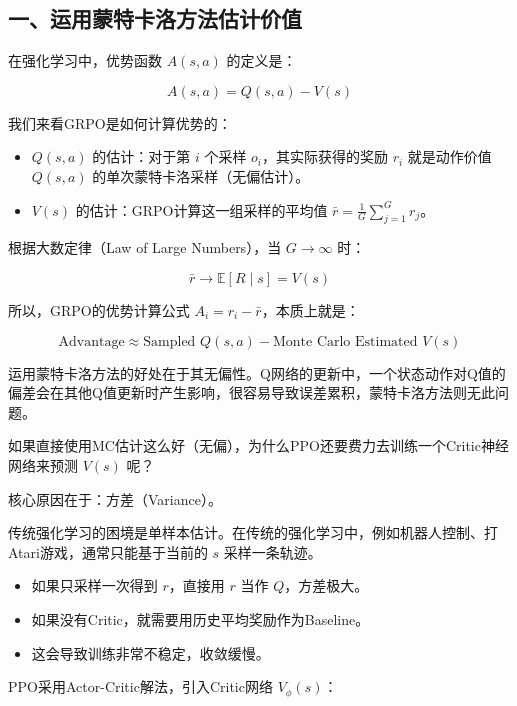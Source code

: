 \hypertarget{ux4e00ux8fd0ux7528ux8499ux7279ux5361ux6d1bux65b9ux6cd5ux4f30ux8ba1ux4ef7ux503c}{%
\subsection{一、运用蒙特卡洛方法估计价值}\label{ux4e00ux8fd0ux7528ux8499ux7279ux5361ux6d1bux65b9ux6cd5ux4f30ux8ba1ux4ef7ux503c}}

在强化学习中，优势函数 \(A(s,a)\) 的定义是：

\[
A(s,a)=Q(s,a)-V(s)
\]

我们来看GRPO是如何计算优势的：

\begin{itemize}
\tightlist
\item
  \(Q(s,a)\) 的估计：对于第 \(i\) 个采样 \(o_i\)，其实际获得的奖励 \(r_i\) 就是动作价值 \(Q(s,a)\) 的单次蒙特卡洛采样（无偏估计）。
\item
  \(V(s)\) 的估计：GRPO计算这一组采样的平均值 \(\bar{r}=\frac{1}{G}\sum_{j=1}^{G}r_j\)。
\end{itemize}

根据大数定律（Law of Large Numbers），当 \(G\to\infty\) 时：

\[
\bar{r}\to \mathbb{E}[R\mid s]=V(s)
\]

所以，GRPO的优势计算公式 \(A_i=r_i-\bar{r}\)，本质上就是：

\[
\text{Advantage}\approx \text{Sampled }Q(s,a)-\text{Monte Carlo Estimated }V(s)
\]

运用蒙特卡洛方法的好处在于其无偏性。Q网络的更新中，一个状态动作对Q值的偏差会在其他Q值更新时产生影响，很容易导致误差累积，蒙特卡洛方法则无此问题。

如果直接使用MC估计这么好（无偏），为什么PPO还要费力去训练一个Critic神经网络来预测 \(V(s)\) 呢？

核心原因在于：方差（Variance）。

传统强化学习的困境是单样本估计。在传统的强化学习中，例如机器人控制、打Atari游戏，通常只能基于当前的 \(s\) 采样一条轨迹。

\begin{itemize}
\tightlist
\item
  如果只采样一次得到 \(r\)，直接用 \(r\) 当作 \(Q\)，方差极大。
\item
  如果没有Critic，就需要用历史平均奖励作为Baseline。
\item
  这会导致训练非常不稳定，收敛缓慢。
\end{itemize}

PPO采用Actor-Critic解法，引入Critic网络 \(V_{\phi}(s)\)：

